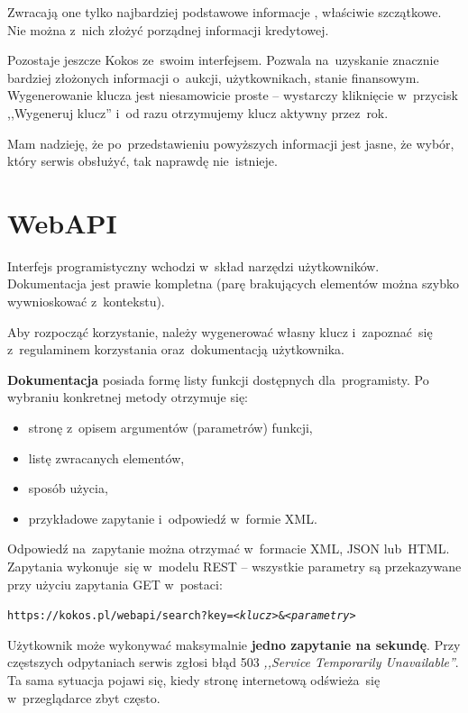 \documentclass[a4paper,twoside,titlepage,openright]{book}
\begin{document}
Zwracają one tylko najbardziej podstawowe informacje \cite{zakraPlApi}, właściwie szczątkowe. Nie można z~nich złożyć porządnej informacji kredytowej.

Pozostaje jeszcze Kokos ze~swoim interfejsem. Pozwala na~uzyskanie znacznie bardziej złożonych informacji o~aukcji, użytkownikach, stanie finansowym. Wygenerowanie klucza jest niesamowicie proste -- wystarczy kliknięcie w~przycisk ,,Wygeneruj klucz'' i~od razu otrzymujemy klucz aktywny przez~rok. 

Mam nadzieję, że po~przedstawieniu powyższych informacji jest jasne, że wybór, który serwis obsłużyć, tak naprawdę nie~istnieje.

\section{WebAPI}

Interfejs programistyczny wchodzi w~skład narzędzi użytkowników. Dokumentacja \cite{kokosPlApi} jest prawie kompletna (parę brakujących elementów można szybko wywnioskować z~kontekstu). 

Aby rozpocząć korzystanie, należy wygenerować własny klucz i~zapoznać~się z~regulaminem korzystania oraz~dokumentacją użytkownika. 

\textbf{Dokumentacja} posiada formę listy funkcji dostępnych dla~programisty. Po wybraniu konkretnej metody otrzymuje się:

\begin{itemize}
\item stronę z~opisem argumentów (parametrów) funkcji,
\item listę zwracanych elementów,
\item sposób użycia, 
\item przykładowe zapytanie i~odpowiedź w~formie XML.
\end{itemize}

Odpowiedź na~zapytanie można otrzymać w~formacie XML, JSON lub~HTML. Zapytania wykonuje~się w~modelu REST -- wszystkie parametry są przekazywane przy użyciu zapytania GET w~postaci:  

\begin{center}
\texttt{https://kokos.pl/webapi/search?key=\textit{<klucz>}\&\textit{<parametry>}}
\end{center}

Użytkownik może wykonywać maksymalnie \textbf{jedno zapytanie na sekundę}. Przy częstszych odpytaniach serwis zgłosi błąd 503 \textit{,,Service Temporarily Unavailable''}. Ta sama sytuacja pojawi się, kiedy stronę internetową odświeża~się w~przeglądarce zbyt często. 
\end{document}
